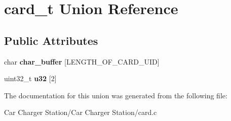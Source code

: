 \hypertarget{unioncard__t}{\section{card\+\_\+t Union Reference}
\label{unioncard__t}
}
\subsection*{Public Attributes}
\begin{DoxyCompactItemize}
\item 
\hypertarget{unioncard__t_ac590016aae05569161b0c2de13e31f37}{char {\bfseries char\+\_\+buffer} \mbox{[}L\+E\+N\+G\+T\+H\+\_\+\+O\+F\+\_\+\+C\+A\+R\+D\+\_\+\+U\+I\+D\mbox{]}}\label{unioncard__t_ac590016aae05569161b0c2de13e31f37}

\item 
\hypertarget{unioncard__t_ae104090579218bd931c5ac9c013d7c66}{uint32\+\_\+t {\bfseries u32} \mbox{[}2\mbox{]}}\label{unioncard__t_ae104090579218bd931c5ac9c013d7c66}

\end{DoxyCompactItemize}


The documentation for this union was generated from the following file\+:\begin{DoxyCompactItemize}
\item 
Car Charger Station/\+Car Charger Station/card.\+c\end{DoxyCompactItemize}

